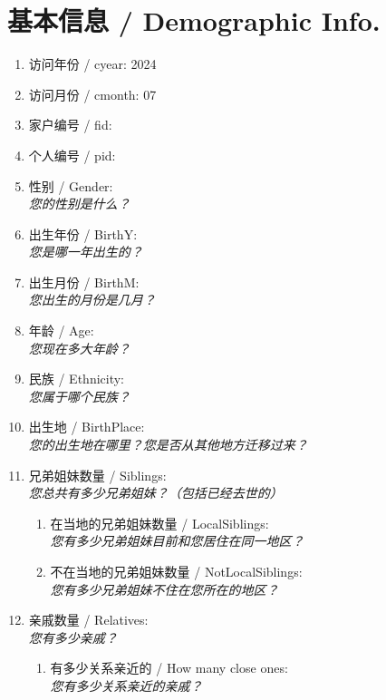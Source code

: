 \documentclass[12pt]{article}
\begin{document}
\section{基本信息 / Demographic Info.}
\begin{enumerate}
    \item 访问年份 / cyear: 2024

    \item 访问月份 / cmonth: 07

    \item 家户编号 / fid: 

    \item 个人编号 / pid: 

    \item 性别 / Gender: \\
    \textit{您的性别是什么？}
   \item 出生年份 / BirthY: \\
    \textit{您是哪一年出生的？}
    \item 出生月份 / BirthM: \\
    \textit{您出生的月份是几月？}
    \item 年龄 / Age: \\
    \textit{您现在多大年龄？}
    \item 民族 / Ethnicity: \\
    \textit{您属于哪个民族？}
    \item 出生地 / BirthPlace: \\
    \textit{您的出生地在哪里？您是否从其他地方迁移过来？}
    \item 兄弟姐妹数量 / Siblings: \\
    \textit{您总共有多少兄弟姐妹？（包括已经去世的）}
    
    \begin{enumerate}
        \item 在当地的兄弟姐妹数量 / LocalSiblings: \\
        \textit{您有多少兄弟姐妹目前和您居住在同一地区？}
        \item 不在当地的兄弟姐妹数量 / NotLocalSiblings: \\
        \textit{您有多少兄弟姐妹不住在您所在的地区？}
    \end{enumerate}
    \item 亲戚数量 / Relatives: \\
    \textit{您有多少亲戚？}
    
    \begin{enumerate}
        \item 有多少关系亲近的 / How many close ones: \\
        \textit{您有多少关系亲近的亲戚？}
    \end{enumerate}
    

\end{enumerate}
\end{document}
